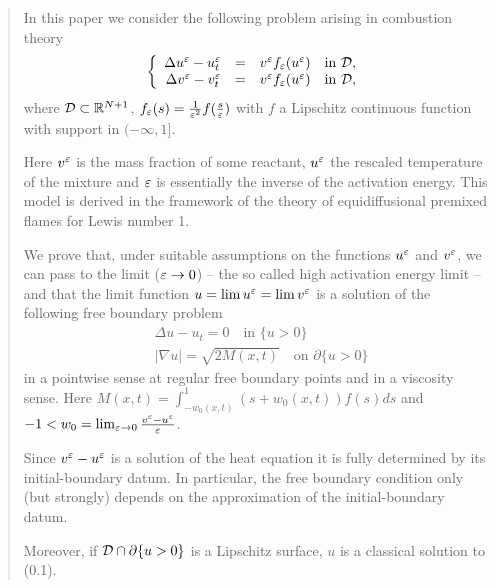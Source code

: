\maketitle

\begin{abstract}
In this paper we consider the following problem arising in combustion theory
$$\left\{\begin{array}{rcll}
\Delta u^{\ve} - u^{\ve}_{t} & = & v^{\ve} f_{\ve}(u^{\ve}) 
& \mbox{in } {\cal D},\\
\Delta v^{\ve} - v^{\ve}_{t} & = & v^{\ve} f_{\ve}(u^{\ve}) 
& \mbox{in } {\cal D},\\
\end{array}\right.$$
where ${\cal D}\subset \R^{N+1}$, $f_\ve(s) = \frac1{\ve^2}
f(\frac s\ve)$ with $f$ a Lipschitz continuous function with support in
$(-\infty,1]$.

Here $\vep$ is the mass fraction of some reactant, $\uep$ the rescaled
temperature of the mixture and $\ep$ is essentially the inverse of the activation energy.
This model is derived in the framework of the theory of
equidiffusional premixed flames for Lewis number 1.

We prove that, under suitable assumptions on the functions $\uep$ and $\vep$, 
we can pass to the limit ($\ve\to0$) -- the so called high activation energy
limit -- and that the limit function
$u=\lim u^{\ve}=\lim v^\ve$ is a solution of the following free boundary problem
\begin{equation}
\begin{aligned}
&\Delta u - u_t = 0\quad \mbox{in } \{ u>0 \}\\
&|\nabla u| = \sqrt{2M(x,t)}\quad \mbox{on } \partial\{ u>0 \}
\end{aligned}
\end{equation}
 in a pointwise sense at regular free boundary 
points and in a viscosity sense. Here $M(x,t)=\int_{-w_0(x,t)}^1(s+w_0(x,t))
f(s)ds$ and $-1<w_0=\lim_{\ve\to0}\frac{v^\ve-u^\ve}{\ve}$.

Since $\vep-\uep$ is a solution of the heat equation it is fully determined by
its initial-boundary datum. In particular, the free boundary condition only (but
strongly) depends
on the approximation of the initial-boundary datum.

Moreover, if ${\cal D}\cap\partial\{u>0\}$ is a Lipschitz surface, $u$ is
a classical solution to (0.1).
\end{abstract}

